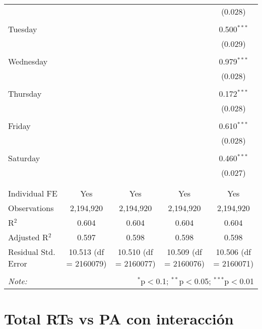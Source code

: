\documentclass[
]{article}
\begin{document}
\begin{table}[!htbp]
{\begin{tabular}{@{\extracolsep{5pt}}lcccc}
  &  &  &  & (0.028) \\ 
  & & & & \\ 
 Tuesday &  &  &  & 0.500$^{***}$ \\ 
  &  &  &  & (0.029) \\ 
  & & & & \\ 
 Wednesday &  &  &  & 0.979$^{***}$ \\ 
  &  &  &  & (0.028) \\ 
  & & & & \\ 
 Thursday &  &  &  & 0.172$^{***}$ \\ 
  &  &  &  & (0.028) \\ 
  & & & & \\ 
 Friday &  &  &  & 0.610$^{***}$ \\ 
  &  &  &  & (0.028) \\ 
  & & & & \\ 
 Saturday &  &  &  & 0.460$^{***}$ \\ 
  &  &  &  & (0.027) \\ 
  & & & & \\ 
\hline \\[-1.8ex] 
Individual FE & Yes & Yes & Yes & Yes \\ 
Observations & 2,194,920 & 2,194,920 & 2,194,920 & 2,194,920 \\ 
R$^{2}$ & 0.604 & 0.604 & 0.604 & 0.604 \\ 
Adjusted R$^{2}$ & 0.597 & 0.598 & 0.598 & 0.598 \\ 
Residual Std. Error & 10.513 (df = 2160079) & 10.510 (df = 2160077) & 10.509 (df = 2160076) & 10.506 (df = 2160071) \\ 
\hline 
\hline \\[-1.8ex] 
\textit{Note:}  & \multicolumn{4}{r}{$^{*}$p$<$0.1; $^{**}$p$<$0.05; $^{***}$p$<$0.01} \\ 
\end{tabular}
} 
\end{table} 
\newpage
\section{Total RTs vs PA con interacción}
\end{document}
